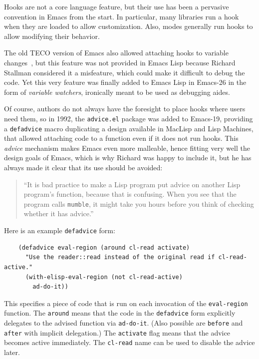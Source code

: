 \documentclass[format=acmsmall, review]{acmart}
\newcommand \Elisp {Emacs Lisp}
\begin{document}
Hooks are not a core language feature, but their use has been a
pervasive convention in Emacs from the start.  In particular, many
libraries run a hook when they are loaded to allow customization.
Also, modes generally run hooks to allow modifying their behavior.

The old TECO version of Emacs also allowed attaching hooks to variable
changes~\cite{Stallman1981}, but this feature was not provided in \Elisp{}
because Richard Stallman considered it a misfeature, which could make it
difficult to debug the code.  Yet this very feature was finally added to
\Elisp{} in Emacs-26 in the form of \emph{variable watchers},
ironically meant to be used as debugging aides.

Of course, authors do not always have the foresight to place hooks where
users need them, so in 1992, the \texttt{advice.el} package was added to
Emacs-19, providing a \texttt{defadvice} macro duplicating a design
available in MacLisp and Lisp Machines, that allowed attaching code to
a function even if it does not run hooks.  This \emph{advice} mechanism
makes Emacs even more malleable, hence fitting very well the design goals of
Emacs, which is why Richard was happy to include it, but he has always made
it clear that its use should be avoided:
\begin{quotation}
  ``It is bad practice to make a Lisp
  program put advice on another Lisp program's function, because that is
  confusing.  When you see that the program calls \texttt{mumble}, it might
  take you hours before you think of checking whether it has
  advice.''~\cite{Stallman2018-personal}
\end{quotation}
Here is an example \texttt{defadvice} form:
%
\begin{verbatim}
    (defadvice eval-region (around cl-read activate)
      "Use the reader::read instead of the original read if cl-read-active."
      (with-elisp-eval-region (not cl-read-active)
        ad-do-it))
\end{verbatim}
%
This specifies a piece of code that is run on each invocation of the
\texttt{eval-region} function.  The \texttt{around} means that the
code in the \texttt{defadvice} form explicitly delegates to the
advised function via \texttt{ad-do-it}.  (Also possible are
\texttt{before} and \texttt{after} with implicit delegation.)  The
\texttt{activate} flag means that the advice becomes active
immediately.  The \texttt{cl-read} name can be used to disable the
advice later.
\end{document}
